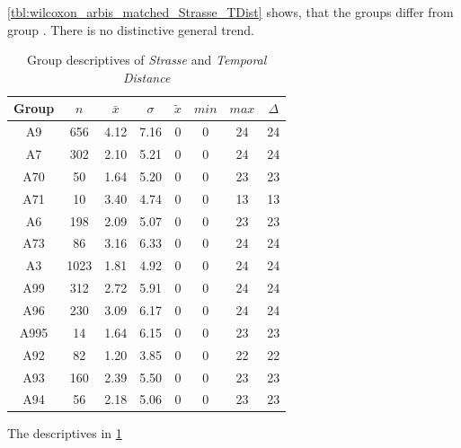 \cref{tbl:wilcoxon_arbis_matched_Strasse_TDist} shows, that the groups  differ from group . There is no distinctive general trend.
\begin{table}[ht!]
	\tiny
	\centering
	\begin{tabular}{c|c|c|c|c|c|c|c}
		\toprule
		Group & $n$ & $\bar{x}$ & $\sigma$ & $\tilde{x}$ & $min$ & $max$ & $\Delta$ \\
		\midrule
		A9   & 656  & 4.12 & 7.16 & 0 & 0 & 24 & 24 \\ 
		A7   & 302  & 2.10 & 5.21 & 0 & 0 & 24 & 24 \\ 
		A70  & 50   & 1.64 & 5.20 & 0 & 0 & 23 & 23 \\ 
		A71  & 10   & 3.40 & 4.74 & 0 & 0 & 13 & 13 \\ 
		A6   & 198  & 2.09 & 5.07 & 0 & 0 & 23 & 23 \\ 
		A73  & 86   & 3.16 & 6.33 & 0 & 0 & 24 & 24 \\ 
		A3   & 1023 & 1.81 & 4.92 & 0 & 0 & 24 & 24 \\ 
		A99  & 312  & 2.72 & 5.91 & 0 & 0 & 24 & 24 \\ 
		A96  & 230  & 3.09 & 6.17 & 0 & 0 & 24 & 24 \\ 
		A995 & 14   & 1.64 & 6.15 & 0 & 0 & 23 & 23 \\ 
		A92  & 82   & 1.20 & 3.85 & 0 & 0 & 22 & 22 \\ 
		A93  & 160  & 2.39 & 5.50 & 0 & 0 & 23 & 23 \\ 
		A94  & 56   & 2.18 & 5.06 & 0 & 0 & 23 & 23 \\ 
		\bottomrule
	\end{tabular}
	\caption{Group descriptives of \textit{Strasse} and \textit{Temporal Distance}}
	\label{tbl:descriptives_arbis_matched_Strasse_TDist}
\end{table}
The descriptives in \cref{tbl:descriptives_arbis_matched_Strasse_TDist}

